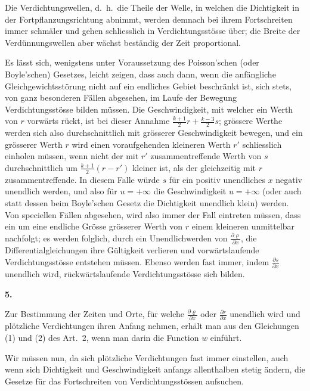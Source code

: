 \documentclass[12pt,a4paper]{book}
\theoremstyle{definition}
\theoremstyle{remark}
\begin{document}
Die Verdichtungswellen, d.~h.~die Theile der Welle, in welchen die Dichtigkeit in der Fortpflanzungsrichtung abnimmt, werden demnach bei ihrem Fortschreiten immer schm\"aler und gehen schliesslich in Verdichtungsst\"osse \"uber; die Breite der Verd\"unnungswellen aber w\"achst best\"andig der Zeit proportional.

Es l\"asst sich, wenigstens unter Voraussetzung des Poisson'schen (oder Boyle'schen) Gesetzes, leicht zeigen, dass auch dann, wenn die anf\"angliche Gleichgewichtsst\"orung nicht auf ein endliches Gebiet beschr\"ankt ist, sich stets, von ganz besonderen F\"allen abgesehen, im Laufe der Bewegung Verdichtungsst\"osse bilden m\"ussen. Die Geschwindigkeit, mit welcher ein Werth von $r$ vorw\"arts r\"uckt, ist bei dieser Annahme $\frac{k+1}{2}r + \frac{k-3}{2}s$; gr\"ossere Werthe werden sich also durchschnittlich mit gr\"osserer Geschwindigkeit bewegen, und ein gr\"osserer Werth $r$ wird einen voraufgehenden kleineren Werth $r'$ schliesslich einholen m\"ussen, wenn nicht der mit $r'$ zusammentreffende Werth von $s$ durchschnittlich um $\frac{k+1}{2}(r - r')$ kleiner ist, als der gleichzeitig mit $r$ zusammentreffende. In diesem Falle w\"urde $s$ f\"ur ein positiv unendliches $x$ negativ unendlich werden, und also f\"ur $u = +\infty$ die Geschwindigkeit $u = +\infty$ (oder auch statt dessen beim Boyle'schen Gesetz die Dichtigkeit unendlich klein) werden. Von speciellen F\"allen abgesehen, wird also immer der Fall eintreten m\"ussen, dass ein um eine endliche Gr\"osse gr\"osserer Werth von $r$ einem kleineren unmittelbar nachfolgt; es werden folglich, durch ein Unendlichwerden von $\frac{\partial\varrho}{\partial x}$, die Differentialgleichungen ihre G\"ultigkeit verlieren und vorw\"artslaufende Verdichtungsst\"osse entstehen m\"ussen. Ebenso werden fast immer, indem $\frac{\partial s}{\partial x}$ unendlich wird, r\"uckw\"artslaufende Verdichtungsst\"osse sich bilden.

\newpage
\begin{center}
\textbf{5.}
\end{center}

Zur Bestimmung der Zeiten und Orte, f\"ur welche $\frac{\partial\varrho}{\partial x}$ oder $\frac{\partial r}{\partial x}$ unendlich wird und pl\"otzliche Verdichtungen ihren Anfang nehmen, erh\"alt man aus den Gleichungen (1) und (2) des Art.~2, wenn man darin die Function $w$ einf\"uhrt.

Wir m\"ussen nun, da sich pl\"otzliche Verdichtungen fast immer einstellen, auch wenn sich Dichtigkeit und Geschwindigkeit anfangs allenthalben stetig \"andern, die Gesetze f\"ur das Fortschreiten von Verdichtungsst\"ossen aufsuchen.
\end{document}
